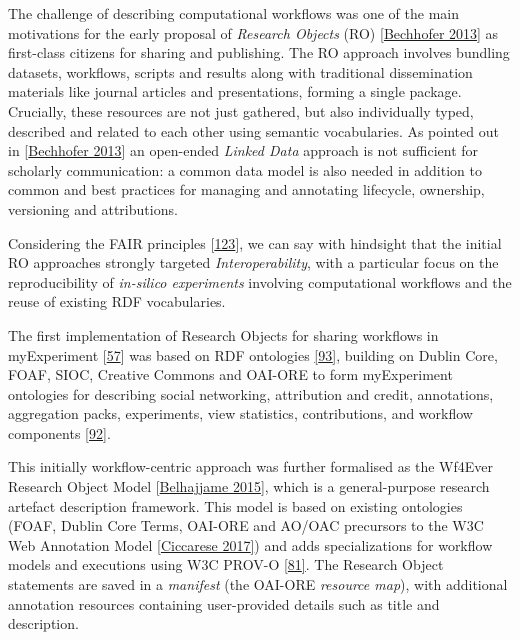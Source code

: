 The challenge of describing computational workflows was one of the main
motivations for the early proposal of \emph{Research Objects} (RO)
{[}\href{https://www.research.manchester.ac.uk/portal/en/publications/why-linked-data-is-not-enough-for-scientists(479e591e-b295-4478-b0c7-a145c19dcd45).html}{Bechhofer 2013}{]}
as first-class citizens for sharing and publishing. The RO approach
involves bundling datasets, workflows, scripts and results along with
traditional dissemination materials like journal articles and
presentations, forming a single package. Crucially, these resources are
not just gathered, but also individually typed, described and related to
each other using semantic vocabularies. As pointed out in
{[}\href{https://doi.org/10.1016/j.future.2011.08.004}{Bechhofer 2013}{]} an
open-ended \emph{Linked Data} approach is not sufficient for scholarly
communication: a common data model is also needed in addition to common
and best practices for managing and annotating lifecycle, ownership,
versioning and attributions.

Considering the FAIR principles
{[}\href{https://doi.org/10.1038/sdata.2016.18}{123}{]}, we can say with
hindsight that the initial RO approaches strongly targeted
\emph{Interoperability}, with a particular focus on the reproducibility
of \emph{in-silico experiments} involving computational workflows and
the reuse of existing RDF vocabularies.

The first implementation of Research Objects for sharing workflows in
myExperiment {[}\href{https://doi.org/10.1093/nar/gkq429}{57}{]} was
based on RDF ontologies
\href{http://ceur-ws.org/Vol-523/Newman.pdf}{{[}93{]}}, building on
Dublin Core, FOAF, SIOC, Creative Commons and OAI-ORE to form
myExperiment ontologies for describing social networking, attribution
and credit, annotations, aggregation packs, experiments, view
statistics, contributions, and workflow components
\href{https://web.archive.org/web/20091115080336/http\%3a\%2f\%2frdf.myexperiment.org/ontologies}{{[}92{]}}.

This initially workflow-centric approach was further formalised as the
Wf4Ever Research Object Model
{[}\href{https://doi.org/10.1016/j.websem.2015.01.003}{Belhajjame 2015}{]}, which is
a general-purpose research artefact description framework. This model is
based on existing ontologies (FOAF, Dublin Core Terms, OAI-ORE and
AO/OAC precursors to the W3C Web Annotation Model
\href{https://www.w3.org/TR/2017/REC-annotation-model-20170223/}{{[}Ciccarese 2017{]}})
and adds specializations for workflow models and executions using W3C
PROV-O \href{https://www.w3.org/TR/2013/REC-prov-o-20130430/}{{[}81{]}}.
The Research Object statements are saved in a \emph{manifest} (the
OAI-ORE \emph{resource map}), with additional annotation resources
containing user-provided details such as title and description.

